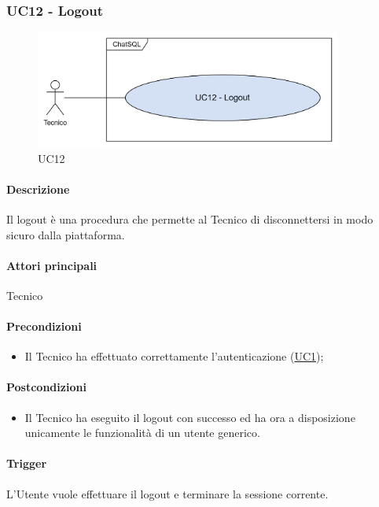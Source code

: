 \subsubsection{UC12 - Logout}\label{UC12}

\begin{figure}[H]
  \centering
  \includegraphics[width=0.90\textwidth]{assets/uc12.png}
  \caption{UC12}
\end{figure}

\paragraph*{Descrizione}
Il logout è una procedura che permette al Tecnico di disconnettersi in modo sicuro dalla piattaforma.

\paragraph*{Attori principali}
Tecnico

\paragraph*{Precondizioni}
\begin{itemize}
  \item Il Tecnico ha effettuato correttamente l'autenticazione (\hyperref[UC1]{UC1});
\end{itemize}

\paragraph*{Postcondizioni}
\begin{itemize}
  \item Il Tecnico ha eseguito il logout con successo ed ha ora a disposizione unicamente le funzionalità di un utente generico.
\end{itemize}

\paragraph*{Trigger}
L'Utente vuole effettuare il logout e terminare la sessione corrente.


